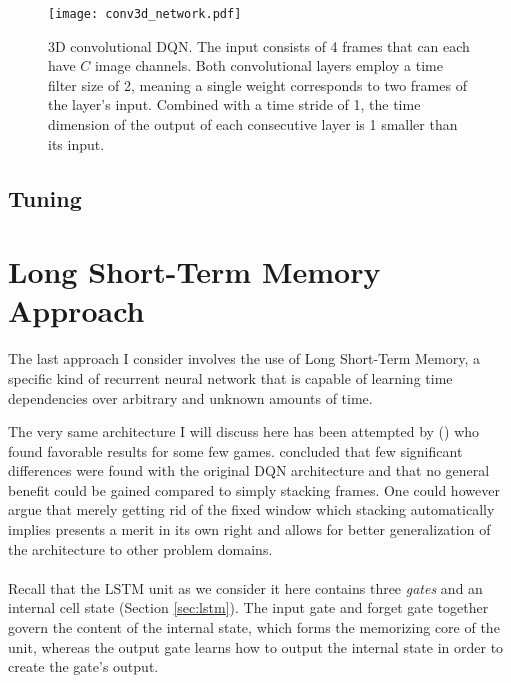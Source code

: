 \begin{figure}[htpb]
  \centering
  \texttt{[image: conv3d\_network.pdf]}
  \caption{
    3D convolutional DQN.
    The input consists of 4 frames
    that can each have $C$ image channels.
    Both convolutional layers employ a time filter size of 2,
    meaning a single weight corresponds to
    two frames of the layer's input.
    Combined with a time stride of 1,
    the time dimension of the output of each consecutive layer
    is 1 smaller than its input.
  }
  \label{fig:conv3d_network}
\end{figure}

\subsection{Tuning}
\label{sub:conv3d_tuning}


\section{Long Short-Term Memory Approach}
\label{sec:long_short_term_memory_approach}
The last approach I consider involves
the use of Long Short-Term Memory,
a specific kind of recurrent neural network
that is capable of learning time dependencies
over arbitrary and unknown amounts of time.

The very same architecture I will discuss here
has been attempted by
\citeauthor{Hausknecht2015} (\citeyear{Hausknecht2015})
who found favorable results for some few games.
\citeauthor{Hausknecht2015}
concluded that few significant differences
were found with the original DQN architecture
and that no general benefit could be gained compared
to simply stacking frames.
One could however argue
that merely getting rid of the fixed window
which stacking automatically implies
presents a merit in its own right
and allows for better generalization of the architecture
to other problem domains.

\paragraph{}
Recall that the LSTM unit as we consider it here
contains three \textit{gates}
and an internal cell state (Section \ref{sec:lstm}).
The input gate and forget gate together govern
the content of the internal state,
which forms the memorizing core of the unit,
whereas the output gate
learns how to output the internal state
in order to create the gate's output.

